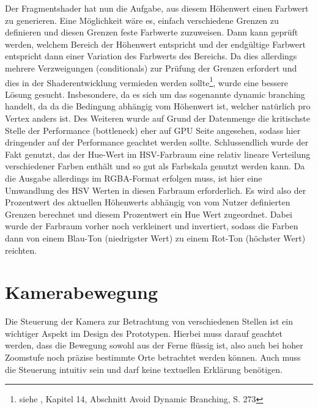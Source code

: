 Der Fragmentshader hat nun die Aufgabe, aus diesem Höhenwert einen Farbwert zu generieren. Eine Möglichkeit wäre es, einfach verschiedene Grenzen zu definieren und diesen Grenzen feste Farbwerte zuzuweisen. Dann kann geprüft werden, welchem Bereich der Höhenwert entspricht und der endgültige Farbwert entspricht dann einer Variation des Farbwerts des Bereichs. Da dies allerdings mehrere Verzweigungen (conditionals) zur Prüfung der Grenzen erfordert und dies in der Shaderentwicklung vermieden werden sollte\footnote{siehe \cite{shaderDev}, Kapitel 14, Abschnitt Avoid Dynamic Branching, S. 273}, wurde eine bessere Lösung gesucht. Insbesondere, da es sich um das sogenannte dynamic branching handelt, da da die Bedingung abhängig vom Höhenwert ist, welcher natürlich pro Vertex anders ist. Des Weiteren wurde auf Grund der Datenmenge die kritischste Stelle der Performance (bottleneck) eher auf GPU Seite angesehen, sodass hier dringender auf der Performance geachtet werden sollte. Schlussendlich wurde der Fakt genutzt, das der Hue-Wert im HSV-Farbraum eine relativ lineare Verteilung verschiedener Farben enthält und so gut als Farbskala genutzt werden kann. Da die Ausgabe allerdings im RGBA-Format erfolgen muss, ist hier eine Umwandlung des HSV Werten in diesen Farbraum erforderlich. Es wird also der Prozentwert des aktuellen Höhenwerts abhängig von vom Nutzer definierten Grenzen berechnet und diesem Prozentwert ein Hue Wert zugeordnet. Dabei wurde der Farbraum vorher noch verkleinert und invertiert, sodass die Farben dann von einem Blau-Ton (niedrigster Wert) zu einem Rot-Ton (höchster Wert) reichten. 

\section{Kamerabewegung}
Die Steuerung der Kamera zur Betrachtung von verschiedenen Stellen ist ein wichtiger Aspekt im Design des Prototypen. Hierbei muss darauf geachtet werden, dass die Bewegung sowohl aus der Ferne flüssig ist, also auch bei hoher Zoomstufe noch präzise bestimmte Orte betrachtet werden können. Auch muss die Steuerung intuitiv sein und darf keine textuellen Erklärung benötigen.

